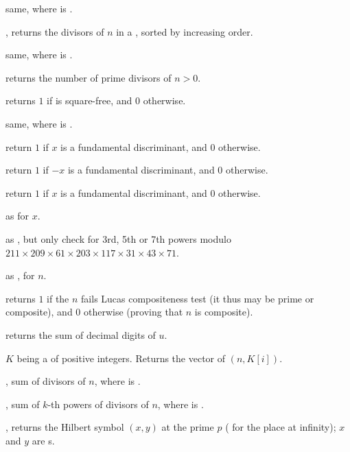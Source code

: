 same, where  is .


, returns the divisors of $n$ in a
, sorted by increasing order.

 same, where  is .

 returns the number of prime divisors of $n > 0$.

 returns $1$ if 
is square-free, and $0$ otherwise.

 same, where  is
.

 return $1$ if $x$ is a fundamental
discriminant, and $0$ otherwise.

 return $1$ if $-x$ is a fundamental
discriminant, and $0$ otherwise.

 return $1$ if $x$ is a fundamental
discriminant, and $0$ otherwise.

 as 
for  $x$.

 as , but
only check for 3rd, 5th or 7th powers modulo
$211\times209\times61\times203\times117\times31\times43\times71$.

 as , for
 $n$.

 returns $1$ if the  $n$ fails Lucas
compositeness test (it thus may be prime or composite), and $0$ otherwise
(proving that $n$ is composite).

 returns the sum of decimal digits of $u$.

 $K$ being a  of
positive integers. Returns the vector of $(n, K[i])$.

, sum of divisors of  $n$, where
 is .

, sum of $k$-th powers of divisors
of  $n$, where  is .

, returns the Hilbert symbol
$(x,y)$ at the prime $p$ ( for the place at infinity); $x$ and $y$
are s.

